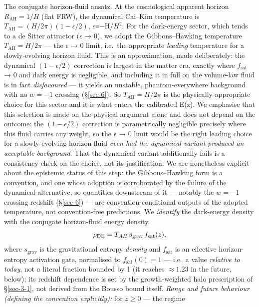 \documentclass[preprint,12pt]{elsarticle}
\begin{document}
The conjugate horizon-fluid ansatz. At the cosmological apparent horizon
\(R_\mathrm{AH} = 1/H\) (flat FRW), the dynamical Cai--Kim temperature
is \(T_\mathrm{AH} = (H/2\pi )(1 - \epsilon /2)\),
\(\epsilon\)≡−Ḣ/\(H^{2}\). For the dark-energy sector, which tends to a
de Sitter attractor \((\epsilon\) → 0), we adopt the Gibbons--Hawking
temperature \(T_\mathrm{AH} = H/2\pi\) --- the \(\epsilon\) → 0 limit,
i.e.~the appropriate \emph{leading} temperature for a slowly-evolving
horizon fluid. This is an approximation, made deliberately: the
dynamical \((1 - \epsilon /2)\) correction is largest in the matter era,
exactly where \(f_{\mathrm{sat}}\) → 0 and dark energy is negligible,
and including it in full on the volume-law fluid is in fact
\emph{disfavoured} --- it yields an unstable, phantom-everywhere
background with no \(w = -1\) crossing (§\ref{sec-6}). So
\(T_\mathrm{AH} = H/2\pi\) is the physically-appropriate choice for this
sector and it is what enters the calibrated E(z). We emphasise that this
selection is made on the physical argument alone and does not depend on
the outcome: the \((1 - \epsilon /2)\) correction is parametrically
negligible precisely where this fluid carries any weight, so the
\(\epsilon\) → 0 limit would be the right leading choice for a
slowly-evolving horizon fluid \emph{even had the dynamical variant
produced an acceptable background}. That the dynamical variant
additionally fails is a consistency check on the choice, not its
justification. We are nonetheless explicit about the epistemic status of
this step: the Gibbons--Hawking form is a convention, and one whose
adoption is corroborated by the failure of the dynamical alternative, so
quantities downstream of it --- notably the \(w = -1\) crossing redshift
(§\ref{sec-6}) --- are convention-conditional outputs of the adopted
temperature, not convention-free predictions. We \emph{identify} the
dark-energy density with the conjugate horizon-fluid energy density,
\begin{equation}\rho_{\rm DE} = T_{AH}\, s_{\rm grav}\, f_{\rm sat}(z),\end{equation} where
\(s_{\mathrm{grav}}\) is the gravitational entropy \emph{density} and
\(f_{\mathrm{sat}}\) is an effective horizon-entropy activation gate,
normalised to \(f_{\mathrm{sat}}(0) = 1\) --- i.e.~a value
\emph{relative to today}, not a literal fraction bounded by 1 (it
reaches \(\approx  1.23\) in the future, below); its redshift dependence
is set by the growth-weighted halo prescription of §\ref{sec-3-1}, not
derived from the Bousso bound itself. \emph{Range and future behaviour
(defining the convention explicitly):} for \(z \geq  0\) --- the regime
\end{document}
